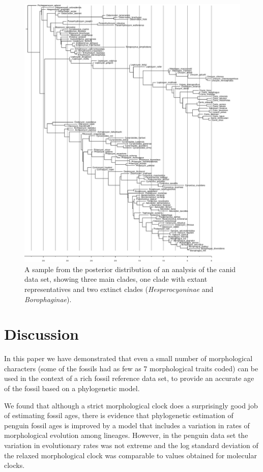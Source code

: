 \documentclass[11pt]{article}
\begin{document}
\begin{figure}
\includegraphics[width=15cm]{canids/stratRanges/1_canids_ranges_3_subset-1460502871266-tree10001.pdf}
\caption{\label{fig:canidTree} A sample from the posterior distribution of an analysis of the canid data set, 
showing three main clades, one clade with extant representatives and two extinct clades ({\it Hesperocyoninae} and {\it Borophaginae}).}
\end{figure}

\section*{Discussion}

In this paper we have demonstrated that even a small number of morphological characters (some of the fossils had as few as 7 morphological traits coded) can be used in the context of a rich fossil reference data set, to provide an accurate age of the fossil based on a phylogenetic model. 

We found that although a strict morphological clock does a surprisingly good job of estimating fossil ages, there is evidence that phylogenetic estimation of penguin fossil ages is improved by a model that includes a variation in rates of morphological evolution among lineages. 
However, in the penguin data set the variation in evolutionary rates was not extreme and the log standard deviation of the relaxed morphological clock was comparable to values obtained for molecular clocks.   
\end{document}
